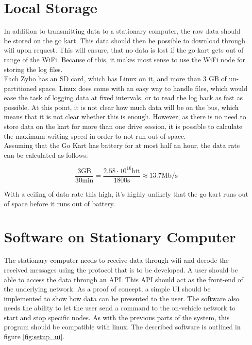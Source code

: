 
\section{Local Storage}
In addition to transmitting data to a stationary computer, the raw data should be stored on the go kart.
This data should then be possible to download through wifi upon request.
This will ensure, that no data is lost if the go kart gets out of range of the WiFi.
Because of this, it makes most sense to use the WiFi node for storing the log files.\\

Each Zybo has an SD card, which has Linux on it, and more than 3 GB of un-partitioned space. 
Linux does come with an easy way to handle files, which would ease the task of logging data at fixed intervals, or to read the log back as fast as possible.
At this point, it is not clear how much data will be on the bus, which means that it is not clear whether this is enough.
However, as there is no need to store data on the kart for more than one drive session, it is possible to calculate the maximum writing speed in order to not run out of space.\\

Assuming that the Go Kart has battery for at most half an hour, the data rate can be calculated as follows:

\begin{equation}
	\frac{3\mathrm{GB}}{30\si{\minute}} = \frac{2.58 \cdot 10^{10} \mathrm{bit}}{1800 \si{\second}} \approx 13.7 \mathrm{Mb/s}
\end{equation}

With a ceiling of data rate this high, it's highly unlikely that the go kart runs out of space before it runs out of battery.

\section{Software on Stationary Computer}
The stationary computer needs to receive data through wifi and decode the received messages using the protocol that is to be developed.
A user should be able to access the data through an API.
This API should act as the front-end of the underlying network.
As a proof of concept, a simple UI should be implemented to show how data can be presented to the user.
The software also needs the ability to let the user send a command to the on-vehicle network to start and stop specific nodes.
As with the previous parts of the system, this program should be compatible with linux.
The described software is outlined in figure \ref{fig:setup_ui}.

